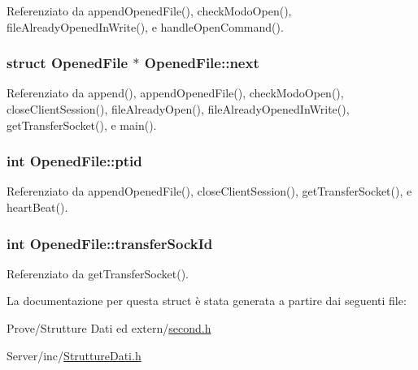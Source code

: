 Referenziato da append\+Opened\+File(), check\+Modo\+Open(), file\+Already\+Opened\+In\+Write(), e handle\+Open\+Command().

\hypertarget{structOpenedFile_a9b8c8b995cdda6da249a6ce9a9df98b2}{}
\subsubsection[{next}]{\setlength{\rightskip}{0pt plus 5cm}struct {\bf Opened\+File} $\ast$ Opened\+File\+::next}\label{structOpenedFile_a9b8c8b995cdda6da249a6ce9a9df98b2}


Referenziato da append(), append\+Opened\+File(), check\+Modo\+Open(), close\+Client\+Session(), file\+Already\+Open(), file\+Already\+Opened\+In\+Write(), get\+Transfer\+Socket(), e main().

\hypertarget{structOpenedFile_aba1e9ae457adfa6a9cc6a22ca4ee290d}{}
\subsubsection[{ptid}]{\setlength{\rightskip}{0pt plus 5cm}int Opened\+File\+::ptid}\label{structOpenedFile_aba1e9ae457adfa6a9cc6a22ca4ee290d}


Referenziato da append\+Opened\+File(), close\+Client\+Session(), get\+Transfer\+Socket(), e heart\+Beat().

\hypertarget{structOpenedFile_a122a7d3d722dc1f7c63857af2024f098}{}
\subsubsection[{transfer\+Sock\+Id}]{\setlength{\rightskip}{0pt plus 5cm}int Opened\+File\+::transfer\+Sock\+Id}\label{structOpenedFile_a122a7d3d722dc1f7c63857af2024f098}


Referenziato da get\+Transfer\+Socket().



La documentazione per questa struct è stata generata a partire dai seguenti file\+:\begin{DoxyCompactItemize}
\item 
Prove/\+Strutture Dati ed extern/\hyperlink{second_8h}{second.\+h}\item 
Server/inc/\hyperlink{StruttureDati_8h}{Strutture\+Dati.\+h}\end{DoxyCompactItemize}

